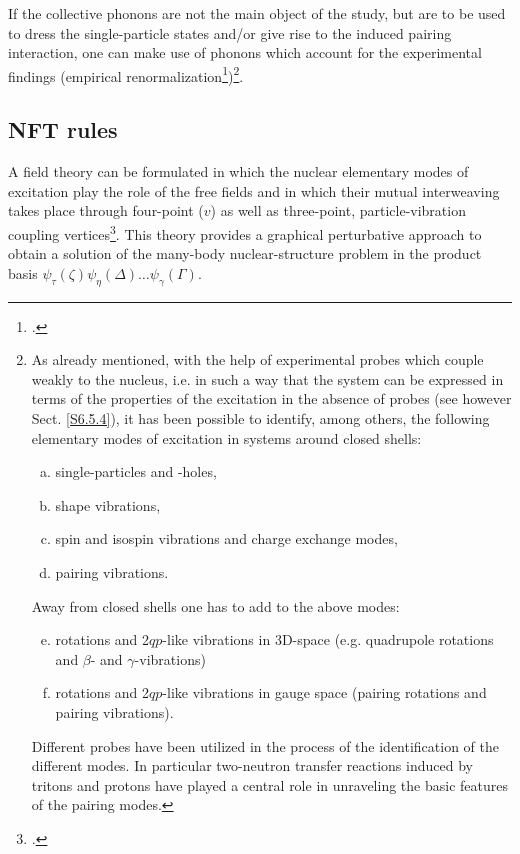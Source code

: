 If the collective phonons are not the main object  of the study, but are to be used to dress the single-particle states and/or give rise to the induced pairing interaction, one can make use of phonons which account for the experimental findings (empirical renormalization\footnote{\cite{Idini:15,Broglia:16,Barranco:17}.})\footnote{As already mentioned, with the help of experimental probes which couple weakly to the nucleus,
i.e. in such a way that the system can be expressed in terms of the properties
of the excitation in the absence of probes (see however Sect. \ref{S6.5.4}), it has been possible to identify, among others, the
following elementary modes of excitation in systems around closed shells:
\begin{enumerate}[a)]
\item single-particles and -holes,
\item shape vibrations,
\item spin and isospin vibrations and charge exchange modes,
\item pairing vibrations.
\end{enumerate}
Away from closed shells one has to add to the above modes:
\begin{enumerate}[a)]
\setcounter{enumi}{4}
\item rotations and 2$qp$-like vibrations in 3D-space (e.g. quadrupole rotations and $\beta$- and $\gamma$-vibrations)
\item rotations and 2$qp$-like vibrations in gauge space (pairing rotations and pairing vibrations).
\end{enumerate}
Different probes have been utilized in the process of the identification of the different modes. In particular two-neutron transfer reactions induced by tritons
and protons have played a central role in unraveling the basic features of the pairing modes.}.




 
\subsection[NFT rules]{NFT rules}\label{Sect1.7.2}
A field theory can be formulated in which the nuclear elementary modes of
excitation  play the role of the free fields and in which their mutual interweaving takes place through four-point ($v$) as well as three-point, particle-vibration coupling vertices\footnote{\cite{Bes:74,Broglia:76,Bohr:75,Mottelson:76}.}.
This theory provides a graphical perturbative approach to obtain a 
solution of the many-body nuclear-structure problem in the product basis $\psi_\tau(\zeta)\psi_\eta(\Delta)\dots\psi_\gamma(\Gamma)$.




